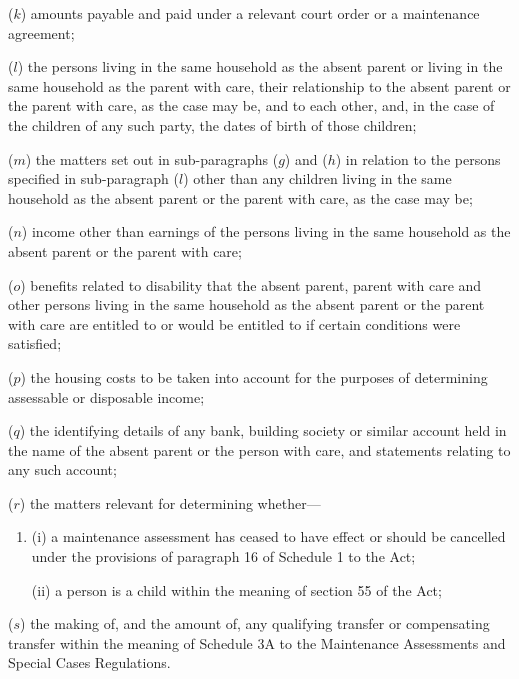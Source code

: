 \documentclass[a4paper,12pt]{article}
\begin{document}
\begin{enumerate}
($k$) amounts payable and paid under a relevant court order or a maintenance agreement;

($l$) the persons living in the same household as the absent parent or living in the same household as the parent with care, their relationship to the absent parent or the parent with care, as the case may be, and to each other, and, in the case of the children of any such party, the dates of birth of those children;

($m$) the matters set out in sub-paragraphs ($g$) and ($h$) in relation to the persons specified in sub-paragraph ($l$) other than any children living in the same household as the absent parent or the parent with care, as the case may be;

($n$) income other than earnings of the persons living in the same household as the absent parent or the parent with care;

($o$) benefits related to disability that the absent parent, parent with care and other persons living in the same household as the absent parent or the parent with care are entitled to or would be entitled to if certain conditions were satisfied;

($p$) the housing costs to be taken into account for the purposes of determining assessable or disposable income;

($q$) the identifying details of any bank, building society or similar account held in the name of the absent parent or the person with care, and statements relating to any such account;

($r$) the matters relevant for determining whether—
\begin{enumerate}\item[]
(i) a maintenance assessment has ceased to have effect or should be cancelled under the provisions of paragraph 16 of Schedule 1 to the Act;

(ii) a person is a child within the meaning of section 55 of the Act;
\end{enumerate}

($s$) the making of, and the amount of, any qualifying transfer or compensating transfer within the meaning of Schedule 3A to the Maintenance Assessments and Special Cases Regulations.
\end{enumerate}

\end{document}
